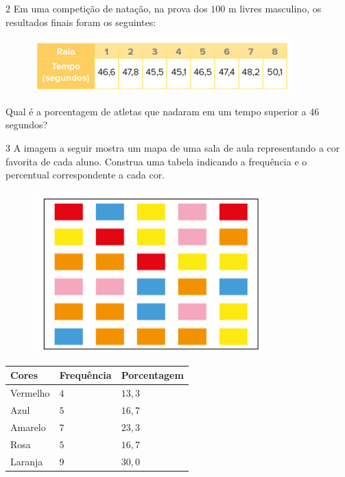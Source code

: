 {

\num{2}  Em uma competição de natação, na prova dos $100$ m livres masculino, os
resultados finais foram os seguintes:

\begin{figure}
\includegraphics[width=3.92708in,height=0.8125in]{./imgSAEB_6_MAT/media/image81.png}
\end{figure}

Qual é a porcentagem de atletas que nadaram em um tempo superior a $46$
segundos?


\num{3}  A imagem a seguir mostra um mapa de uma sala de aula representando a
cor favorita de cada aluno. Construa uma tabela indicando a frequência e
o percentual correspondente a cada cor.

\begin{figure}
\includegraphics[width=3.52292in,height=2.45347in]{./imgSAEB_6_MAT/media/image82.png}
\end{figure}


\begin{longtable}[]{@{}lll@{}}
\toprule
Cores & Frequência & Porcentagem\tabularnewline
\midrule
\endhead
Vermelho & $4$ & $13,3$\tabularnewline
Azul & $5$ & $16,7$\tabularnewline
Amarelo & $7$ & $23,3$\tabularnewline
Rosa & $5$ & $16,7$\tabularnewline
Laranja & $9$ & $30,0$\tabularnewline
\bottomrule
\end{longtable}

\reduline{\hfill}

}

